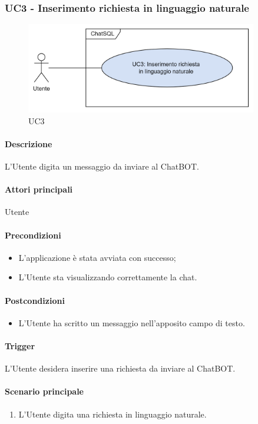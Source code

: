 \subsubsection{UC3 - Inserimento richiesta in linguaggio naturale}\label{UC3}

\begin{figure}[H]
  \centering
  \includegraphics[width=0.90\textwidth]{assets/uc3.png}
  \caption{UC3}
\end{figure}

\paragraph*{Descrizione}
L'Utente digita un messaggio da inviare al ChatBOT.

\paragraph*{Attori principali}
Utente

\paragraph*{Precondizioni}
\begin{itemize}
  \item L'applicazione è stata avviata con successo;
  \item L'Utente sta visualizzando correttamente la chat.
\end{itemize}

\paragraph*{Postcondizioni}
\begin{itemize}
  \item L'Utente ha scritto un messaggio nell'apposito campo di testo.
\end{itemize}

\paragraph*{Trigger}
L'Utente desidera inserire una richiesta da inviare al ChatBOT.

\paragraph*{Scenario principale}
\begin{enumerate}
  \item L'Utente digita una richiesta in linguaggio naturale.
\end{enumerate}